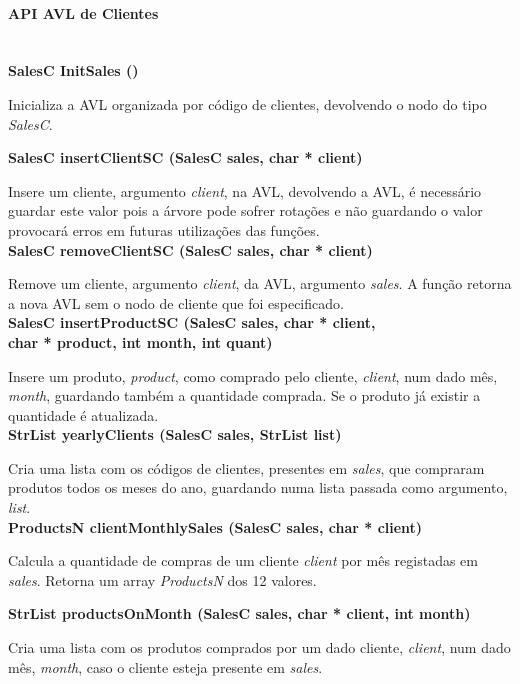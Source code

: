 \documentclass[10pt] {article}
\begin{document}
\paragraph{API AVL de Clientes}\mbox{}\\
\noindent \textbf {SalesC InitSales ()}
\par Inicializa a AVL organizada por código de clientes, devolvendo o nodo do tipo \emph{SalesC}.

\noindent \textbf {SalesC insertClientSC (SalesC sales, char * client)}
\par Insere um cliente, argumento \emph{client}, na AVL, devolvendo a AVL, é necessário guardar este valor
pois a árvore pode sofrer rotações e não guardando o valor provocará erros em futuras utilizações das funções. \\

\noindent \textbf {SalesC removeClientSC (SalesC sales, char * client)}
\par Remove um cliente, argumento \emph{client}, da AVL, argumento \emph{sales}. A função retorna a nova AVL
sem o nodo de cliente que foi especificado. \\

\noindent \textbf {SalesC insertProductSC (SalesC sales, char * client, \\ char * product, int month, int quant)}
\par Insere um produto, \emph{product}, como comprado pelo cliente, \emph{client}, num dado mês, \emph{month},
guardando também a quantidade comprada. Se o produto já existir a quantidade é atualizada. \\

\noindent \textbf {StrList yearlyClients (SalesC sales, StrList list)}
\par Cria uma lista com os códigos de clientes, presentes em \emph{sales}, que compraram produtos todos os
meses do ano, guardando numa lista passada como argumento, \emph{list}. \\

\noindent \textbf {ProductsN clientMonthlySales (SalesC sales, char * client)}
\par Calcula a quantidade de compras de um cliente \emph{client} por mês registadas em \emph{sales}. Retorna um array \emph{ProductsN} dos 12 valores.

\noindent \textbf {StrList productsOnMonth (SalesC sales, char * client, int month)}
\par Cria uma lista com os produtos comprados por um dado cliente, \emph{client}, num dado mês, \emph{month},
caso o cliente esteja presente em \emph{sales}. \\
\end{document}
